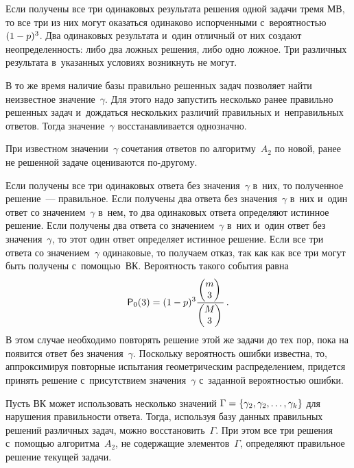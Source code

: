\begin{multicols}{2}
  Если получены все три одинаковых результата решения одной задачи тремя 
МВ, то все три из них могут оказаться одинаково испорченными с~вероятностью 
$(1\hm-p)^3$. Два одинаковых результата и~один отличный от них создают 
неопределенность: либо два ложных решения, либо одно ложное. Три различных 
результата в~указанных условиях возникнуть не могут.
  
  В то же время наличие базы правильно решенных задач позволяет найти 
неизвестное значение~$\gamma$. Для этого надо запустить несколько ранее 
правильно решенных задач и~дождаться нескольких различий правильных 
и~неправильных ответов. Тогда значение~$\gamma$ восстанавливается 
однозначно.
  
   При известном значении~$\gamma$ сочетания ответов по алгоритму~$A_2$ по 
новой, ранее не решенной задаче оцениваются по-дру\-гому.
  
  Если получены все три одинаковых ответа без значения~$\gamma$ в~них, то 
полученное решение~--- правильное. Если получены два ответа без 
значения~$\gamma$ в~них и~один ответ со значением~$\gamma$ в~нем, то два 
одинаковых ответа определяют истинное решение. Если получены два ответа со 
значением~$\gamma$ в~них и~один ответ без значения~$\gamma$, то этот один 
ответ определяет истинное решение. Если все три ответа со значением~$\gamma$ 
одинаковые, то получаем отказ, так как как все три могут быть получены 
с~по\-мощью~ВК. Вероятность такого события равна
  $$
  {\sf P}_0(3)=(1-p)^3\displaystyle\frac{\displaystyle \begin{pmatrix} m\\ 3\end{pmatrix}\mathstrut}{\displaystyle \begin{pmatrix} M\\ 
3\end{pmatrix}\mathstrut}\,.
  $$
    В этом случае необходимо повторять решение этой же задачи до тех пор, пока 
на появится ответ без значения~$\gamma$. Поскольку вероятность ошибки 
известна, то, аппроксимируя повторные испытания гео\-мет\-ри\-че\-ским 
распределением, придется принять решение с~присутствием значения~$\gamma$ с~заданной вероятностью ошибки.
  
  Пусть ВК может использовать несколько значений $\Gamma\hm= \{ \gamma_2, 
\gamma_2, \ldots , \gamma_k\}$ для нарушения правильности ответа. Тогда, используя базу 
данных правильных решений различных задач, можно \mbox{восстановить}~$\Gamma$. 
При этом все три решения с~по\-мощью алгоритма~$A_2$, не содержащие 
элементов~$\Gamma$, определяют правильное решение текущей задачи. 
  

\end{multicols}
